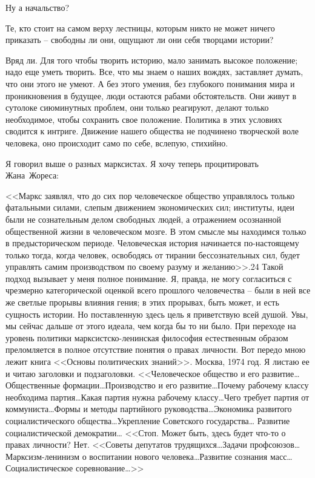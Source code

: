 \documentclass{book}
\begin{document}
Ну а начальство?

Те, кто стоит на самом верху лестницы, которым никто не может ничего приказать -- свободны ли они, ощущают ли они себя творцами 
истории?

Вряд ли. Для того чтобы творить историю, мало занимать высокое положение; надо еще уметь творить.  Все, что мы знаем о наших 
вождях, заставляет думать, что они этого не умеют. А без этого умения, без глубокого понимания мира и проник­новения в будущее, 
люди остаются рабами обстоятельств. Они живут в сутолоке сиюминутных проблем, они только реаги­руют, делают только необходимое, 
чтобы сохранить свое поло­жение. Политика в этих условиях сводится к интриге. Движе­ние нашего общества не подчинено творческой 
воле человека, оно происходит само по себе, вслепую, стихийно.

Я говорил выше о разных марксистах. Я хочу теперь проци­тировать Жана~Жореса:

<<Маркс заявлял, что до сих пор человеческое общество управлялось только фатальными силами, слепым движением экономических сил; 
институты, идеи были не сознательным делом свободных людей, а отражением осознанной обществен­ной жизни в человеческом мозге. В 
этом смысле мы находим­ся только в предысторическом периоде. Человеческая история начинается по-настоящему только тогда, когда 
человек, освободясь от тирании бессознательных сил, будет управлять самим производством по своему разуму и желанию>>.24
Такой подход вызывает у меня полное понимание. Я, правда, не могу согласиться с чрезмерно категорической оценкой всего прошлого 
человечества -- были в ней все же светлые прорывы влияния гения; в этих прорывах, быть может, и есть сущность истории. Но 
поставленную здесь цель я приветствую всей душой. Увы, мы сейчас дальше от этого идеала, чем когда бы то ни было.
При переходе на уровень политики марксистско-ленинская философия естественным образом преломляется в полное отсутствие понятия о 
правах личности. Вот передо мною лежит книга <<Основы политических знаний>>. Москва, 1974 год. Я листаю ее и читаю заголовки и 
подзаголовки. <<Человеческое общество и его развитие\ldots Общественные формации\ldots Производство и его развитие\ldots Почему 
рабочему классу необходима партия\ldots Какая партия нужна рабочему классу\ldots Чего требует партия от коммуниста\ldots Формы и 
методы партийного руко­водства\ldots Экономика развитого социалистического общества\ldots Укрепление Советского государства\ldots 
Развитие социалистиче­ской демократии… <<Стоп. Может быть, здесь будет что-то о правах личности? Нет. <<Советы депутатов 
трудящихся\ldots Задачи профсоюзов\ldots Марксизм-ленинизм о воспитании нового человека\ldots Развитие сознания масс\ldots 
Социалистическое соревнование\ldots>>
\end{document}
